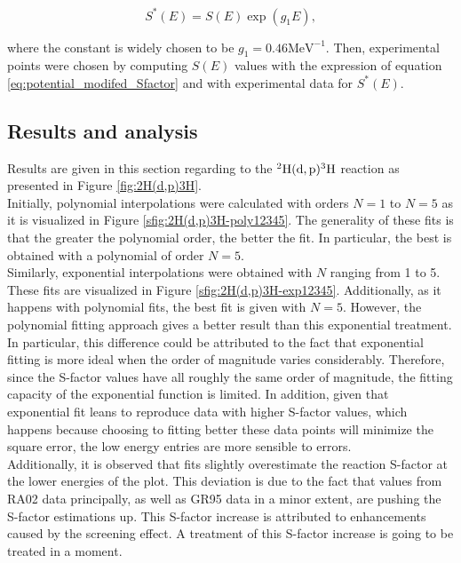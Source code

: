 \documentclass[openany]{book}
\begin{document}
\begin{equation}\label{eq:potential_modifed_Sfactor}
	S^{*}(E) = S(E) \exp {(g_1E)},
\end{equation}

where the constant is widely chosen to be $g_1 = 0.46 \mathrm{MeV^{-1}}$. Then, experimental points were chosen by computing $S(E)$ values with the expression of equation \ref{eq:potential_modifed_Sfactor} and with experimental data for $S^{*}(E)$.


\subsection{Results and analysis} \label{sub:resultsAnalysisNonResonant}

Results are given in this section regarding to the $\mathrm{{}^{2}H(d, p){}^{3}H}$ reaction as presented in Figure \ref{fig:2H(d,p)3H}. \\ 

Initially, polynomial interpolations were calculated with orders $N = 1$ to $N = 5$ as it is visualized in Figure \ref{sfig:2H(d,p)3H-poly12345}. The generality of these fits is that the greater the polynomial order, the better the fit. In particular, the best is obtained with a polynomial of order $N = 5$.  \\

Similarly, exponential interpolations were obtained with $N$ ranging from 1 to 5. These fits are visualized in Figure \ref{sfig:2H(d,p)3H-exp12345}. Additionally, as it happens with polynomial fits, the best fit is given with $N = 5$. However, the polynomial fitting approach gives a better result than this exponential treatment. \\

In particular, this difference could be attributed to the fact that exponential fitting is more ideal when the order of magnitude varies considerably. Therefore, since the S-factor values have all roughly the same order of magnitude, the fitting capacity of the exponential function is limited. In addition, given that exponential fit leans to reproduce data with higher S-factor values, which happens because choosing to fitting better these data points will minimize the square error, the low energy entries are more sensible to errors.  \\

Additionally, it is observed that fits slightly overestimate the reaction S-factor at the lower energies of the plot. This deviation is due to the fact that values from RA02 data principally, as well as GR95 data in a minor extent, are pushing the S-factor estimations up. This S-factor increase is attributed to enhancements caused by the screening effect. A treatment of this S-factor increase is going to be treated in a moment. \\
\end{document}
